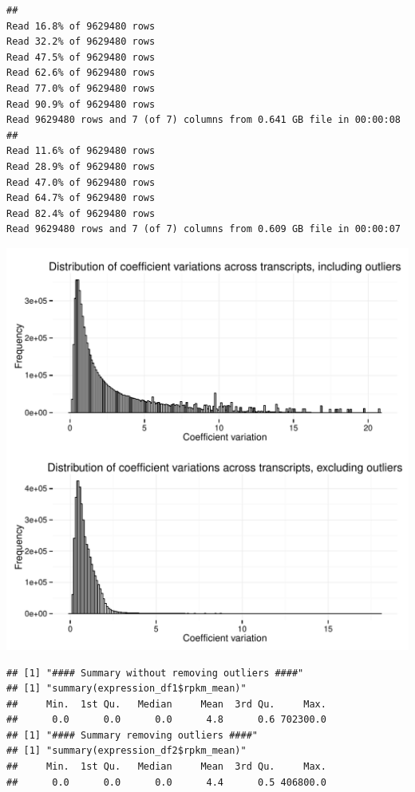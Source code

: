\documentclass{article}\usepackage[]{graphicx}\usepackage[]{color}
\makeatletter
\def\maxwidth{ %
  \ifdim\Gin@nat@width>\linewidth
    \linewidth
  \else
    \Gin@nat@width
  \fi
}
\newenvironment{kframe}{%
 \def\at@end@of@kframe{}%
 \ifinner\ifhmode%
  \def\at@end@of@kframe{\end{minipage}}%
  \begin{minipage}{\columnwidth}%
 \fi\fi%
 \def\FrameCommand##1{\hskip\@totalleftmargin \hskip-\fboxsep
 \colorbox{shadecolor}{##1}\hskip-\fboxsep
     \hskip-\linewidth \hskip-\@totalleftmargin \hskip\columnwidth}%
 \MakeFramed {\advance\hsize-\width
   \@totalleftmargin\z@ \linewidth\hsize
   \@setminipage}}%
 {\par\unskip\endMakeFramed%
 \at@end@of@kframe}
\newenvironment{knitrout}{}{} %
\makeatother
\begin{document}
\begin{knitrout}
\color{fgcolor}\begin{kframe}
\begin{verbatim}
## 
Read 16.8% of 9629480 rows
Read 32.2% of 9629480 rows
Read 47.5% of 9629480 rows
Read 62.6% of 9629480 rows
Read 77.0% of 9629480 rows
Read 90.9% of 9629480 rows
Read 9629480 rows and 7 (of 7) columns from 0.641 GB file in 00:00:08
## 
Read 11.6% of 9629480 rows
Read 28.9% of 9629480 rows
Read 47.0% of 9629480 rows
Read 64.7% of 9629480 rows
Read 82.4% of 9629480 rows
Read 9629480 rows and 7 (of 7) columns from 0.609 GB file in 00:00:07
\end{verbatim}
\end{kframe}
\includegraphics[width=\maxwidth]{figure/transcript_expression_averages-1} 
\begin{kframe}\begin{verbatim}
## [1] "#### Summary without removing outliers ####"
## [1] "summary(expression_df1$rpkm_mean)"
##     Min.  1st Qu.   Median     Mean  3rd Qu.     Max. 
##      0.0      0.0      0.0      4.8      0.6 702300.0 
## [1] "#### Summary removing outliers ####"
## [1] "summary(expression_df2$rpkm_mean)"
##     Min.  1st Qu.   Median     Mean  3rd Qu.     Max. 
##      0.0      0.0      0.0      4.4      0.5 406800.0 

\end{verbatim}
\end{kframe}
\end{knitrout}
\end{document}
